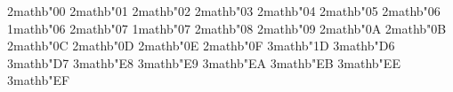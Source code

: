 \newcommand{\blank}{\mathord{\hspace{1pt}\text{--}\hspace{1pt}}}
\newcommand{\nameless}{\mathord{\hspace{1pt}\underline{\hspace{1ex}}\hspace{1pt}}}

\DeclareMathSymbol{\dotplus}       {2}{mathb}{"00}%
\DeclareMathSymbol{\dotdiv}        {2}{mathb}{"01}%
\DeclareMathSymbol{\dottimes}      {2}{mathb}{"02}%
\DeclareMathSymbol{\divdot}        {2}{mathb}{"03}%
\DeclareMathSymbol{\udot}          {2}{mathb}{"04}%
\DeclareMathSymbol{\square}        {2}{mathb}{"05}%
\DeclareMathSymbol{\Asterisk}      {2}{mathb}{"06}
\DeclareMathSymbol{\bigast}        {1}{mathb}{"06}
\DeclareMathSymbol{\coAsterisk}    {2}{mathb}{"07}
\DeclareMathSymbol{\bigcoast}      {1}{mathb}{"07}
\DeclareMathSymbol{\circplus}      {2}{mathb}{"08}%
\DeclareMathSymbol{\pluscirc}      {2}{mathb}{"09}%
\DeclareMathSymbol{\convolution}   {2}{mathb}{"0A}%
\DeclareMathSymbol{\divideontimes} {2}{mathb}{"0B}%
\DeclareMathSymbol{\blackdiamond}  {2}{mathb}{"0C}%
\DeclareMathSymbol{\sqbullet}      {2}{mathb}{"0D}%
\DeclareMathSymbol{\bigstar}       {2}{mathb}{"0E}
\DeclareMathSymbol{\bigvarstar}    {2}{mathb}{"0F}
\DeclareMathSymbol{\corresponds}   {3}{mathb}{"1D}%
\DeclareMathSymbol{\updownarrows}          {3}{mathb}{"D6}
\DeclareMathSymbol{\downuparrows}          {3}{mathb}{"D7}
\DeclareMathSymbol{\Lsh}                   {3}{mathb}{"E8}
\DeclareMathSymbol{\Rsh}                   {3}{mathb}{"E9}
\DeclareMathSymbol{\dlsh}                  {3}{mathb}{"EA}
\DeclareMathSymbol{\drsh}                  {3}{mathb}{"EB}
\DeclareMathSymbol{\looparrowdownleft}     {3}{mathb}{"EE}
\DeclareMathSymbol{\looparrowdownright}    {3}{mathb}{"EF}
